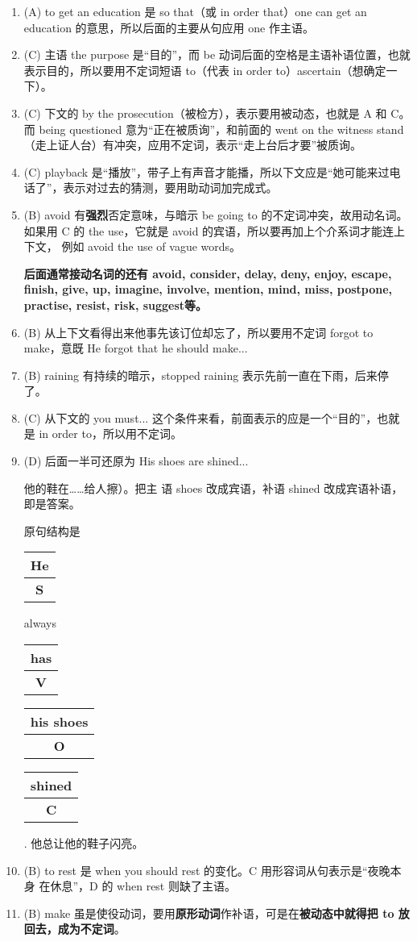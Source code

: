 \documentclass{yufa}
\makeatletter
\newcommand\unct[2]{\def\arraystretch{0.8}
  {\setlength{\tabcolsep}{0pt}
    \begin{tabular}[t]{@{}c@{}} \setlength\arrayrulewidth{0.8pt} \textbf{#1}\\\hline \textbf{\small #2} \\\end{tabular}}}
\makeatother
\begin{document}
\begin{enumerate}
\item (A) to get an education 是 so that（或 in order that）one can get an education 的意思，所以后面的主要从句应用 one 作主语。


\item  (C) 主语 the purpose 是“目的”，而 be 动词后面的空格是主语补语位置，也就表示目的，所以要用不定词短语 to（代表 in order to）ascertain（想确定一下）。

\item (C) 下文的 by the prosecution（被检方），表示要用被动态，也就是 A 和 C。而 being questioned 意为“正在被质询”，和前面的 went on the witness stand（走上证人台）有冲突，应用不定词，表示“走上台后才要”被质询。

\item (C) playback 是“播放”，带子上有声音才能播，所以下文应是“她可能来过电话了”，表示对过去的猜测，要用助动词加完成式。

\item (B) avoid 有\textbf{强烈}否定意味，与暗示 be going to 的不定词冲突，故用动名词。
  如果用 C 的 the use，它就是 avoid 的宾语，所以要再加上个介系词才能连上下文，
  例如 avoid the use of vague words。

  \textbf{后面通常接动名词的还有 avoid, consider, delay, deny, enjoy, escape,
    finish, give, up, imagine, involve, mention, mind, miss, postpone,
    practise, resist, risk, suggest等。}

\item (B) 从上下文看得出来他事先该订位却忘了，所以要用不定词 forgot to make，意既 He forgot that he should make...



\item (B) raining 有持续的暗示，stopped raining 表示先前一直在下雨，后来停了。

\item (C) 从下文的 you must... 这个条件来看，前面表示的应是一个“目的”，也就
  是 in order to，所以用不定词。

\item (D) 后面一半可还原为 His shoes are shined...

他的鞋在……给人擦）。把主
  语 shoes 改成宾语，补语 shined 改成宾语补语，即是答案。

  原句结构是 \unct{He}{S} always \unct{has}{V} \unct{his shoes}{O}
  \unct{shined}{C}. 他总让他的鞋子闪亮。

\item (B) to rest 是 when you should rest 的变化。C 用形容词从句表示是“夜晚本身
  在休息”，D 的 when rest 则缺了主语。

\item (B) make 虽是使役动词，要用\textbf{原形动词}作补语，可是在\textbf{被动态中就得把 to 放
    回去，成为不定词}。


\end{enumerate}
\end{document}

